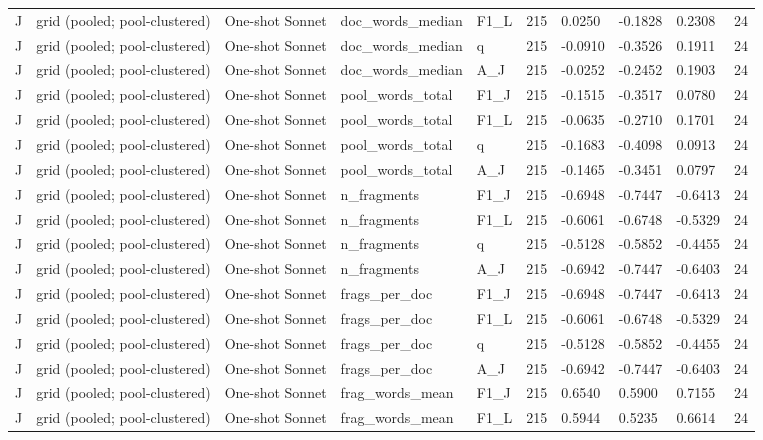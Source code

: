 \begin{table}[t]
{\begin{tabular}{llllllllll}
J & grid (pooled; pool-clustered) & One-shot Sonnet & doc\_words\_median & F1\_L & 215 & 0.0250 & -0.1828 & 0.2308 & 24 \\
J & grid (pooled; pool-clustered) & One-shot Sonnet & doc\_words\_median & q & 215 & -0.0910 & -0.3526 & 0.1911 & 24 \\
J & grid (pooled; pool-clustered) & One-shot Sonnet & doc\_words\_median & A\_J & 215 & -0.0252 & -0.2452 & 0.1903 & 24 \\
J & grid (pooled; pool-clustered) & One-shot Sonnet & pool\_words\_total & F1\_J & 215 & -0.1515 & -0.3517 & 0.0780 & 24 \\
J & grid (pooled; pool-clustered) & One-shot Sonnet & pool\_words\_total & F1\_L & 215 & -0.0635 & -0.2710 & 0.1701 & 24 \\
J & grid (pooled; pool-clustered) & One-shot Sonnet & pool\_words\_total & q & 215 & -0.1683 & -0.4098 & 0.0913 & 24 \\
J & grid (pooled; pool-clustered) & One-shot Sonnet & pool\_words\_total & A\_J & 215 & -0.1465 & -0.3451 & 0.0797 & 24 \\
J & grid (pooled; pool-clustered) & One-shot Sonnet & n\_fragments & F1\_J & 215 & -0.6948 & -0.7447 & -0.6413 & 24 \\
J & grid (pooled; pool-clustered) & One-shot Sonnet & n\_fragments & F1\_L & 215 & -0.6061 & -0.6748 & -0.5329 & 24 \\
J & grid (pooled; pool-clustered) & One-shot Sonnet & n\_fragments & q & 215 & -0.5128 & -0.5852 & -0.4455 & 24 \\
J & grid (pooled; pool-clustered) & One-shot Sonnet & n\_fragments & A\_J & 215 & -0.6942 & -0.7447 & -0.6403 & 24 \\
J & grid (pooled; pool-clustered) & One-shot Sonnet & frags\_per\_doc & F1\_J & 215 & -0.6948 & -0.7447 & -0.6413 & 24 \\
J & grid (pooled; pool-clustered) & One-shot Sonnet & frags\_per\_doc & F1\_L & 215 & -0.6061 & -0.6748 & -0.5329 & 24 \\
J & grid (pooled; pool-clustered) & One-shot Sonnet & frags\_per\_doc & q & 215 & -0.5128 & -0.5852 & -0.4455 & 24 \\
J & grid (pooled; pool-clustered) & One-shot Sonnet & frags\_per\_doc & A\_J & 215 & -0.6942 & -0.7447 & -0.6403 & 24 \\
J & grid (pooled; pool-clustered) & One-shot Sonnet & frag\_words\_mean & F1\_J & 215 & 0.6540 & 0.5900 & 0.7155 & 24 \\
J & grid (pooled; pool-clustered) & One-shot Sonnet & frag\_words\_mean & F1\_L & 215 & 0.5944 & 0.5235 & 0.6614 & 24 \\

\end{tabular}}
\end{table}

